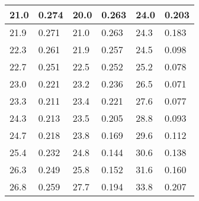 \begin{table}[]
\begin{tabular}{|ll|ll|ll|}
    \multicolumn{1}{|l|}{21.0}              & 0.274                & \multicolumn{1}{l|}{20.0}              & 0.263               & \multicolumn{1}{l|}{24.0}              & 0.203               \\ \hline
    \multicolumn{1}{|l|}{21.9}              & 0.271                & \multicolumn{1}{l|}{21.0}              & 0.263               & \multicolumn{1}{l|}{24.3}              & 0.183               \\ \hline
    \multicolumn{1}{|l|}{22.3}              & 0.261                & \multicolumn{1}{l|}{21.9}              & 0.257               & \multicolumn{1}{l|}{24.5}              & 0.098               \\ \hline
    \multicolumn{1}{|l|}{22.7}              & 0.251                & \multicolumn{1}{l|}{22.5}              & 0.252               & \multicolumn{1}{l|}{25.2}              & 0.078               \\ \hline
    \multicolumn{1}{|l|}{23.0}              & 0.221                & \multicolumn{1}{l|}{23.2}              & 0.236               & \multicolumn{1}{l|}{26.5}              & 0.071               \\ \hline
    \multicolumn{1}{|l|}{23.3}              & 0.211                & \multicolumn{1}{l|}{23.4}              & 0.221               & \multicolumn{1}{l|}{27.6}              & 0.077               \\ \hline
    \multicolumn{1}{|l|}{24.3}              & 0.213                & \multicolumn{1}{l|}{23.5}              & 0.205               & \multicolumn{1}{l|}{28.8}              & 0.093               \\ \hline
    \multicolumn{1}{|l|}{24.7}              & 0.218                & \multicolumn{1}{l|}{23.8}              & 0.169               & \multicolumn{1}{l|}{29.6}              & 0.112               \\ \hline
    \multicolumn{1}{|l|}{25.4}              & 0.232                & \multicolumn{1}{l|}{24.8}              & 0.144               & \multicolumn{1}{l|}{30.6}              & 0.138               \\ \hline
    \multicolumn{1}{|l|}{26.3}              & 0.249                & \multicolumn{1}{l|}{25.8}              & 0.152               & \multicolumn{1}{l|}{31.6}              & 0.160               \\ \hline
    \multicolumn{1}{|l|}{26.8}              & 0.259                & \multicolumn{1}{l|}{27.7}              & 0.194               & \multicolumn{1}{l|}{33.8}              & 0.207               \\ \hline

\end{tabular}
\end{table}
